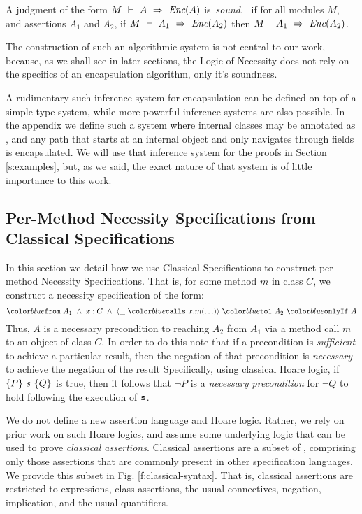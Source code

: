 \begin{definition}
\label{lem:encap-soundness}
A judgment of the form $M\ \vdash\ A\ \Rightarrow\ \textit{Enc}(A)$  is\  \emph{sound}, \ if 
for all modules $M$, and assertions $A_1$ and $A_2$, if 
$M\ \vdash\ A_1\ \Rightarrow\ \textit{Enc}(A_2)$ then $M \vDash A_1\ \Rightarrow\ \textit{Enc}(A_2)$.
\end{definition}


The construction of such an algorithmic system is not central to our work,
because, as we shall see in later sections,  the Logic of Necessity 
does not rely on the specifics of an encapsulation algorithm, only it's soundness.

A rudimentary such inference system for encapsulation 
can be defined on top of a simple type system, while 
more powerful inference systems are also possible. 
In the appendix we define such a system where internal classes
may be annotated as , and any path that starts at an internal object and
only navigates through  fields is encapsulated. 
We will use that inference system for the proofs in Section \ref{s:examples}, but, as
we said, the exact nature of that system is of little importance to this work. 


\subsection{Per-Method Necessity Specifications from Classical Specifications}
\label{s:classical-proof}
In this section we detail how we use Classical Specifications
to construct per-method Necessity Specifications. 
That is, for some method $m$ in class $C$, we construct a necessity specification of the form:
$$\onlyIfSingle{A_1\ \wedge\ x : C\ \wedge\ \calls{\_}{x}{m}{\ldots}}{A_2}{A}$$
Thus, $A$ is a necessary precondition to reaching $A_2$ from $A_1$ via a method call $m$ to an object of class $C$.
In order to do this
note that if a precondition  is \emph{sufficient}
to achieve a particular result, then the negation of that precondition
is \emph{necessary} to achieve the negation of the result  
Specifically, 
using classical Hoare logic, if $\{P\}\ {{s}}\ \{Q\}$ is true, then 
it follows that $\neg P$ is a \emph{necessary precondition} for $\neg Q$ to 
hold following the execution of ${\texttt{s}}$.

We do not define a new assertion language and Hoare logic.
 Rather, we rely on prior work on such Hoare logics,
  and assume some underlying logic that can be used 
to prove  \emph{classical assertions}. 
Classical assertions are a subset of \SpecO, comprising only those 
assertions that are commonly present in other specification languages.
We provide this subset in Fig. \ref{f:classical-syntax}. That is, classical assertions
are restricted to expressions, class assertions, the usual connectives, negation, 
implication, and the usual quantifiers.


